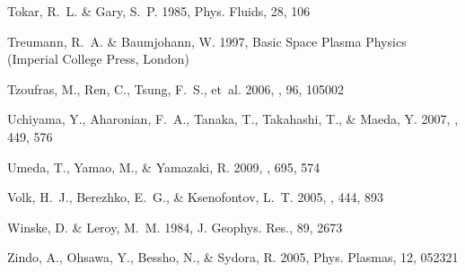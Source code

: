 \documentclass[structabstract]{aa}
\begin{document}
\begin{thebibliography}{71}
Tokar, R.~L. \& Gary, S.~P. 1985, Phys. Fluids, 28, 106

Treumann, R.~A. \& Baumjohann, W. 1997, Basic Space Plasma Physics (Imperial
  College Press, London)

Tzoufras, M., Ren, C., Tsung, F.~S., {et~al.} 2006, \prl, 96, 105002

Uchiyama, Y., Aharonian, F.~A., Tanaka, T., Takahashi, T., \& Maeda, Y. 2007,
  \nat, 449, 576

Umeda, T., Yamao, M., \& Yamazaki, R. 2009, \apj, 695, 574

Volk, H.~J., Berezhko, E.~G., \& Ksenofontov, L.~T. 2005, \aap, 444, 893

Winske, D. \& Leroy, M.~M. 1984, J. Geophys. Res., 89, 2673

Zindo, A., Ohsawa, Y., Bessho, N., \& Sydora, R. 2005, Phys. Plasmas, 12,
  052321

\end{thebibliography}


%
%
\end{document}
